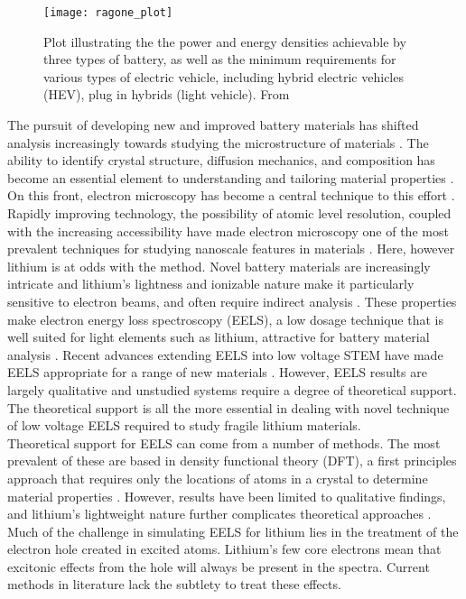 \begin{figure}
	\centering
	\texttt{[image: ragone\_plot]}
	\caption{Plot illustrating the the power and energy densities achievable by three types of battery, as well as the minimum requirements for various types of electric vehicle, including hybrid electric vehicles (HEV), plug in hybrids (light vehicle). From \cite{etacheri_challenges_2011} }
	\label{ragone}
	
\end{figure}
The pursuit of developing new and improved battery materials has shifted analysis increasingly towards studying the microstructure of materials \cite{lu_lithium_2012,arthur_spontaneous_2016, muller_quantification_2018}. The ability to identify crystal structure, diffusion mechanics, and composition has become an essential element to understanding and tailoring material properties \cite{van_der_ven_first-principles_2001}.  On this front, electron microscopy has become a central technique to this effort  \cite{chiu_aqueous_2013,inkson_2_2016}.  Rapidly improving technology, the possibility of atomic level resolution, coupled with the increasing accessibility have made electron microscopy one of the most prevalent techniques for studying nanoscale features in materials \cite{hansen_atomic-resolution_2001}.  Here, however lithium is at odds with the method.  Novel battery materials are increasingly intricate and lithium's lightness and ionizable nature make it particularly sensitive to electron beams, and often require indirect analysis \cite{kobayashi_quantitative_2017}.  These properties make electron energy loss spectroscopy (EELS), a low dosage technique that is well suited for light elements such as lithium, attractive for battery material analysis  \cite{Egerton}. Recent advances extending EELS into low voltage STEM have made EELS appropriate for a range of new materials \cite{SU_9000}.  However, EELS results are largely qualitative and unstudied systems require a degree of theoretical support.  The theoretical support is all the more essential in dealing with novel technique of low voltage EELS required to study fragile lithium materials.    
\\
Theoretical support for EELS can come from a number of methods. The most prevalent of these are based in density functional theory (DFT), a first principles approach that requires only the locations of atoms in a crystal to determine material properties \cite{ks_1965, wien2k,elk,exciting, vasp}.  However, results have been limited to qualitative findings, and lithium's lightweight nature further complicates theoretical approaches \cite{mauchamp_ab_2006, mauchamp_local_2008}. Much of the challenge in simulating EELS for lithium lies in the treatment of the electron hole created in excited atoms.  Lithium's few core electrons mean that excitonic effects from the hole will always be present in the spectra.  Current methods in literature lack the subtlety to treat these effects. 

